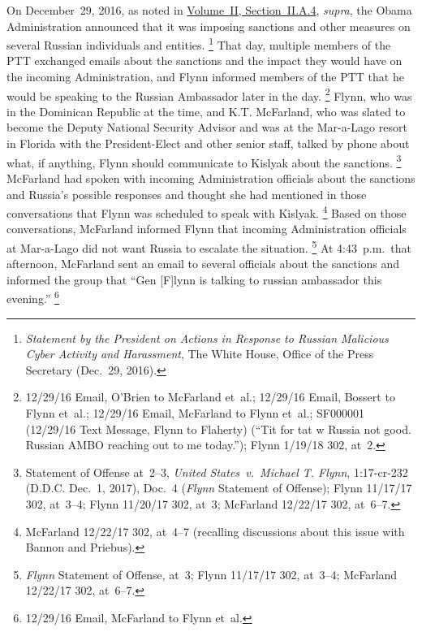 On December~29, 2016, as noted in \hyperlink{subsubsection.2.2.1.4}{Volume~II, Section~II.A.4}, \textit{supra}, the Obama Administration announced that it was imposing sanctions and other measures on several Russian individuals and entities.%
\footnote{\textit{Statement by the President on Actions in Response to Russian Malicious Cyber Activity and Harassment}, The White House, Office of the Press Secretary (Dec.~29, 2016).}
That day, multiple members of the PTT exchanged emails about the sanctions and the impact they would have on the incoming Administration, and Flynn informed members of the PTT that he would be speaking to the Russian Ambassador later in the day.%
\footnote{12/29/16 Email, O'Brien to McFarland et~al.;
12/29/16 Email, Bossert to Flynn et~al.;
12/29/16 Email, McFarland to Flynn et~al.;
SF000001 (12/29/16 Text Message, Flynn to Flaherty) (``Tit for tat w Russia not good. Russian AMBO reaching out to me today.'');
Flynn 1/19/18 302, at~2.}
Flynn, who was in the Dominican Republic at the time, and K.T. McFarland, who was slated to become the Deputy National Security Advisor and was at the Mar-a-Lago resort in Florida with the President-Elect and other senior staff, talked by phone about what, if anything, Flynn should communicate to Kislyak about the sanctions.%
\footnote{Statement of Offense at~2--3, \textit{United States~v.\ Michael T. Flynn}, 1:17-cr-232 (D.D.C. Dec.~1, 2017), Doc.~4 (\textit{Flynn} Statement of Offense);
Flynn 11/17/17 302, at~3--4;
Flynn 11/20/17 302, at~3;
McFarland 12/22/17 302, at~6--7.}
McFarland had spoken with incoming Administration officials about the sanctions and Russia's possible responses and thought she had mentioned in those conversations that Flynn was scheduled to speak with Kislyak.%
\footnote{McFarland 12/22/17 302, at~4--7 (recalling discussions about this issue with Bannon and Priebus).}
Based on those conversations, McFarland informed Flynn that incoming Administration officials at Mar-a-Lago did not want Russia to escalate the situation.%
\footnote{\textit{Flynn} Statement of Offense, at~3;
Flynn 11/17/17 302, at~3--4;
McFarland 12/22/17 302, at~6--7.}
At 4:43~p.m.\ that afternoon, McFarland sent an email to several officials about the sanctions and informed the group that ``Gen [F]lynn is talking to russian ambassador this evening.''%
\footnote{12/29/16 Email, McFarland to Flynn et~al.}

